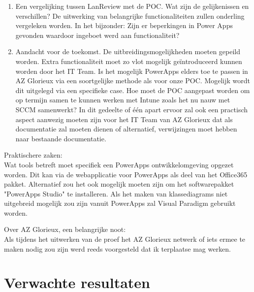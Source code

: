 \begin{enumerate}
    \item Een vergelijking tussen LanReview met de POC. Wat zijn de gelijkenissen en verschillen? De uitwerking van belangrijke functionaliteiten zullen onderling vergeleken worden. In het bijzonder: Zijn er beperkingen in Power Apps gevonden waardoor ingeboet werd aan functionaliteit?
    \item Aandacht voor de toekomst. De uitbreidingsmogelijkheden moeten gepeild worden. Extra functionaliteit moet zo vlot mogelijk geïntroduceerd kunnen worden door het IT Team. Is het mogelijk PowerApps elders toe te passen in AZ Glorieux via een soortgelijke methode als voor onze POC. Mogelijk wordt dit uitgelegd via een specifieke case. Hoe moet de POC aangepast worden om op termijn samen te kunnen werken met Intune zoals het nu nauw met SCCM samenwerkt? In dit gedeelte of één apart ervoor zal ook een practisch aspect aanwezig moeten zijn voor het IT Team van AZ Glorieux dat als documentatie zal moeten dienen of alternatief, verwijzingen moet hebben naar bestaande documentatie.
\end{enumerate}


\vspace{5mm}

Praktischere zaken:\\
Wat tools betreft moet specifiek een PowerApps ontwikkelomgeving opgezet worden. Dit kan via de webapplicatie voor PowerApps als deel van het Office365 pakket. Alternatief zou het ook mogelijk moeten zijn om het softwarepakket "PowerApps Studio" te installeren. Als het maken van klassediagrams niet uitgebreid mogelijk zou zijn vanuit PowerApps zal Visual Paradigm gebruikt worden. 

Over AZ Glorieux, een belangrijke noot:\\
Als tijdens het uitwerken van de proef het AZ Glorieux netwerk of iets ermee te maken nodig zou zijn werd reeds voorgesteld dat ik terplaatse mag werken.

\section{Verwachte resultaten}
\label{sec:verwachte_resultaten}

